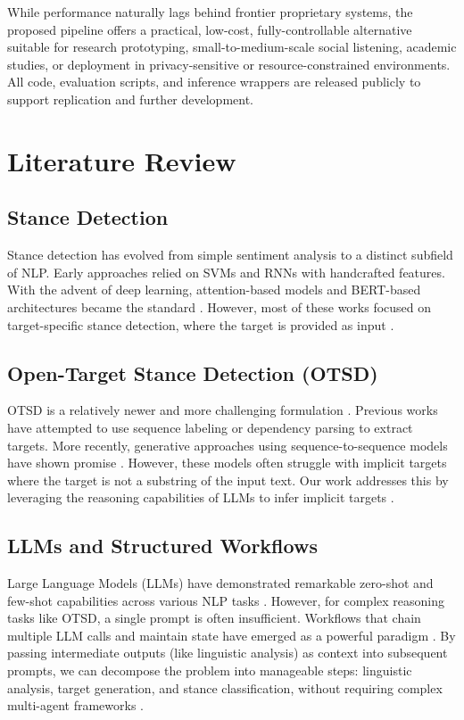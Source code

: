 \documentclass[conference]{IEEEtran}
\begin{document}
While performance naturally lags behind frontier proprietary systems, the proposed pipeline offers a practical, low-cost, fully-controllable alternative suitable for research prototyping, small-to-medium-scale social listening, academic studies, or deployment in privacy-sensitive or resource-constrained environments. All code, evaluation scripts, and inference wrappers are released publicly to support replication and further development.

\section{Literature Review}

\subsection{Stance Detection}
Stance detection has evolved from simple sentiment analysis to a distinct subfield of NLP. Early approaches relied on SVMs and RNNs with handcrafted features. With the advent of deep learning, attention-based models and BERT-based architectures became the standard \cite{b13}. However, most of these works focused on target-specific stance detection, where the target is provided as input \cite{semeval2016}.

\subsection{Open-Target Stance Detection (OTSD)}
OTSD is a relatively newer and more challenging formulation \cite{b18}. Previous works have attempted to use sequence labeling or dependency parsing to extract targets. More recently, generative approaches using sequence-to-sequence models have shown promise \cite{vast2020, b16, b17}. However, these models often struggle with implicit targets where the target is not a substring of the input text. Our work addresses this by leveraging the reasoning capabilities of LLMs to infer implicit targets \cite{b1}.

\subsection{LLMs and Structured Workflows}
Large Language Models (LLMs) have demonstrated remarkable zero-shot and few-shot capabilities across various NLP tasks \cite{b15}. However, for complex reasoning tasks like OTSD, a single prompt is often insufficient. Workflows that chain multiple LLM calls and maintain state have emerged as a powerful paradigm \cite{b2, b10}. By passing intermediate outputs (like linguistic analysis) as context into subsequent prompts, we can decompose the problem into manageable steps: linguistic analysis, target generation, and stance classification, without requiring complex multi-agent frameworks \cite{b3, b8}.
\end{document}
